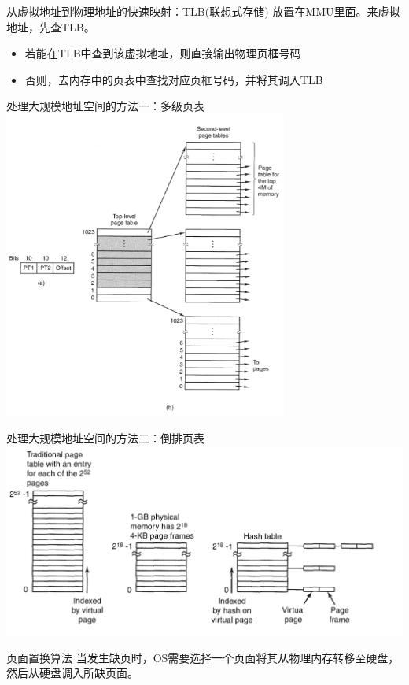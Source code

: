 \documentclass[xcolor=svgnames]{beamer}
\begin{document}
\begin{CJK*}{UTF8}{gbsn}
\begin{frame}{从虚拟地址到物理地址的快速映射：TLB(联想式存储)}
放置在MMU里面。来虚拟地址，先查TLB。
\begin{itemize}
\item 若能在TLB中查到该虚拟地址，则直接输出物理页框号码
\item 否则，去内存中的页表中查找对应页框号码，并将其调入TLB
\end{itemize}
\end{frame}

\begin{frame}{处理大规模地址空间的方法一：多级页表}
\includegraphics[width=0.7\textwidth]{multi.png}
\end{frame}

\begin{frame}{处理大规模地址空间的方法二：倒排页表}
\includegraphics[width=1.0\textwidth]{inverted.png}
\end{frame}

\begin{frame}{页面置换算法}
当发生缺页时，OS需要选择一个页面将其从物理内存转移至硬盘，然后从硬盘调入所缺页面。
\end{frame}


\end{CJK*}
\end{document}
